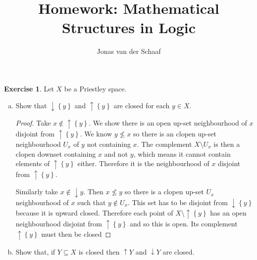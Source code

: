 \documentclass{article}
\title{Homework: Mathematical Structures in Logic}
\author{Jonas van der Schaaf}
\date{}
\newcommand{\set}[1]{\left\{#1\right\}}
\theoremstyle{definition}
\newtheorem{question}{Exercise}
\begin{document}
\maketitle

\begin{question}
    Let \(X\) be a Priestley space.

    \begin{enumerate}[(a)]
        \item Show that \(\downarrow\set{y}\) and \(\uparrow\set{y}\) are closed
              for each \(y\in X\).

              \begin{proof}
                  Take \(x\notin\uparrow\set{y}\). We show there is an open
                  up-set neighbourhood of \(x\) disjoint from
                  \(\uparrow\set{y}\). We know  \(y\nleq x\) so there is an
                  clopen up-set neighbourhood \(U_{x}\) of \(y\) not containing
                  \(x\). The complement \(X\setminus U_{x}\) is then a clopen
                  downset containing \(x\) and not \(y\), which means it cannot
                  contain elements of \(\uparrow\set{y}\) either. Therefore it
                  is the neighbourhood of \(x\) disjoint from
                  \(\uparrow\set{y}\).

                  Similarly take \(x\notin\downarrow{y}\). Then \(x\nleq y\) so
                  there is a clopen up-set \(U_{x}\) neighbourhood of \(x\) such
                  that \(y\notin U_{x}\). This set has to be disjoint from
                  \(\downarrow\set{y}\) because it is upward closed. Therefore
                  each point of \(X\setminus\uparrow\set{y}\) has an open
                  neighbourhood disjoint from \(\uparrow\set{y}\) and so this is
                  open. Its complement \(\uparrow\set{y}\) must then be closed
              \end{proof}

        \item Show that, if \(Y\subseteq X\) is closed then \(\uparrow Y\) and
              \(\downarrow Y\) are closed.


\end{enumerate}
\end{question}
\end{document}
